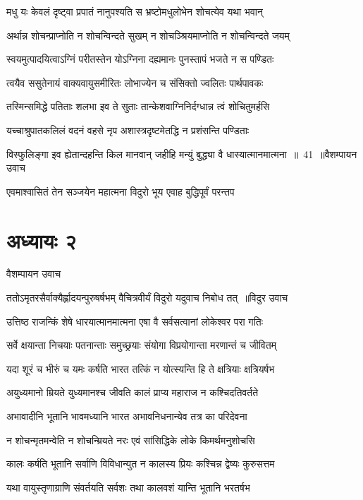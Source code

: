 \twolineshloka
{मधु यः केवलं दृष्ट्वा प्रपातं नानुपश्यति}
{स भ्रष्टोमधुलोभेन शोचत्येव यथा भवान्}


\twolineshloka
{अर्थान्न शोचन्प्राप्नोति न शोचन्विन्दते सुखम्}
{न शोचञ्श्रियमाप्नोति न शोचन्विन्दते जयम्}


\twolineshloka
{स्वयमुत्पादयित्वाऽग्निं परीतस्तेन योऽग्निना}
{दह्यमानः पुनस्तापं भजते न स पण्डितः}


\twolineshloka
{त्वयैव ससुतेनायं वाक्यवायुसमीरितः}
{लोभाज्येन च संसिक्तो ज्वलितः पार्थपावकः}


\twolineshloka
{तस्मिन्समिद्धे पतिताः शलभा इव ते सुताः}
{तान्केशवाग्निनिर्दग्धान्न त्वं शोचितुमर्हसि}


\twolineshloka
{यच्चाश्रुपातकलिलं वदनं वहसे नृप}
{अशास्त्रदृष्टमेतद्धि न प्रशंसन्ति पण्डिताः}


\threelineshloka
{विस्फुलिङ्गा इव ह्येतान्दहन्ति किल मानवान्}
{जहीहि मन्युं बुद्ध्या वै धास्यात्मानमात्मना ॥ 41 ॥वैशम्पायन उवाच}
{}


\twolineshloka
{एवमाश्वासितं तेन सञ्जयेन महात्मना}
{विदुरो भूय एवाह बुद्धिपूर्वं परन्तप}


\chapter{अध्यायः २}
\twolineshloka
{वैशम्पायन उवाच}
{}


\threelineshloka
{ततोऽमृतरसैर्वाक्यैर्ह्लादयन्पुरुषर्षभम्}
{वैचित्रवीर्यं विदुरो यदुवाच निबोध तत् ॥विदुर उवाच}
{}


\twolineshloka
{उत्तिष्ठ राजन्किं शेषे धारयात्मानमात्मना}
{एषा वै सर्वसत्वानां लोकेश्वर परा गतिः}


\twolineshloka
{सर्वे क्षयान्ता निचयाः पतनान्ताः समुच्छ्रयाः}
{संयोगा विप्रयोगान्ता मरणान्तं च जीवितम्}


\twolineshloka
{यदा शूरं च भीरुं च यमः कर्षति भारत}
{तत्किं न योत्स्यन्ति हि ते क्षत्रियाः क्षत्रियर्षभ}


\twolineshloka
{अयुध्यमानो म्रियते युध्यमानश्च जीवति}
{कालं प्राप्य महाराज न कश्चिदतिवर्तते}


\twolineshloka
{अभावादीनि भूतानि भावमध्यानि भारत}
{अभावनिधनान्येव तत्र का परिदेवना}


\twolineshloka
{न शोचन्मृतमन्वेति न शोचन्म्रियते नरः}
{एवं सांसिद्धिके लोके किमर्थमनुशोचसि}


\twolineshloka
{कालः कर्षति भूतानि सर्वाणि विविधान्युत}
{न कालस्य प्रियः कश्चिन्न द्वेष्यः कुरुसत्तम}


\twolineshloka
{यथा वायुस्तृणाग्राणि संवर्तयति सर्वशः}
{तथा कालवशं यान्ति भूतानि भरतर्षभ}


